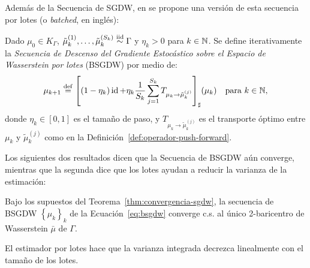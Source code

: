Además de la Secuencia de SGDW, en \cite{backhoff2022stochastic} se propone una versión de esta secuencia por lotes (o \textit{batched}, en inglés):

\begin{definition}\label{def:bsgdw}
    Dado $\mu_0 \in K_\Gamma$, $\tilde \mu_k^{(1)}, \ldots, \tilde \mu_k^{(S_k)} \stackrel{\mathrm{iid}}{\sim} \Gamma$ y $\eta_k > 0$ para $k \in\mathbb{N}$. Se define iterativamente la \textit{Secuencia de Descenso del Gradiente Estocástico sobre el Espacio de Wasserstein por lotes} (BSGDW) por medio de:
    \begin{equation}
        \label{eq:bsgdw}
        \mu_{k+1} \stackrel{\mathrm{def}}{=} {\qty[
                (1 - \eta_k) \operatorname{id} + \eta_k \frac{1}{S_k} \sum_{j=1}^{S_k} T_{\mu_k \to \tilde \mu_k^{(j)}}
            ]}_{\sharp} (\mu_k) \quad \text{para } k \in\mathbb{N},
    \end{equation}
    donde $\eta_k \in [0, 1]$ es el tamaño de paso, y $T_{\mu_k \to \tilde \mu_k^{(j)}}$ es el transporte óptimo entre $\mu_k$ y $\tilde \mu_k^{(j)}$ como en la Definición~\ref{def:operador-push-forward}.
\end{definition}


Los siguientes dos resultados dicen que la Secuencia de BSGDW aún converge, mientras que la segunda dice que los lotes ayudan a reducir la varianza de la estimación:

\begin{proposition}\label{prop:convergencia-bsgdw}
    Bajo los supuestos del Teorema~\ref{thm:convergencia-sgdw}, la secuencia de BSGDW $\left\{ \mu_k \right\}_k$ de la Ecuación~\eqref{eq:bsgdw} converge c.s. al único 2-baricentro de Wasserstein $\bar \mu$ de $\Gamma$.
\end{proposition}

\begin{proposition}
    El estimador por lotes hace que la varianza integrada decrezca linealmente con el tamaño de los lotes.
\end{proposition}

